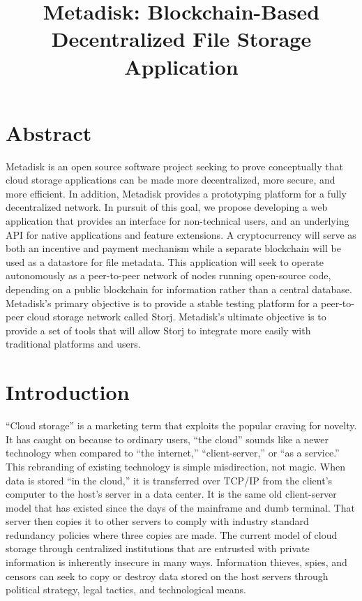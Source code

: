 \documentclass[a4paper,12pt]{article}
\begin{document}
\title{\large \bf Metadisk:  Blockchain-Based Decentralized File Storage Application}
\maketitle

\section*{Abstract}
Metadisk is an open source software project seeking to prove conceptually that cloud storage applications can be made more decentralized, more secure, and more efficient. In addition, Metadisk provides a prototyping platform for a fully decentralized network. In pursuit of this goal, we propose developing a web application that provides an interface for non-technical users, and an underlying API for native applications and feature extensions. A cryptocurrency will serve as both an incentive and payment mechanism while a separate blockchain will be used as a datastore for file metadata. This application will seek to operate autonomously as a peer-to-peer network of nodes running open-source code, depending on a public blockchain for information rather than a central database. Metadisk’s primary objective is to provide a stable testing platform for a peer-to-peer cloud storage network called Storj. Metadisk’s ultimate objective is to provide a set of tools that will allow Storj to integrate more easily with traditional platforms and users. 

\section*{Introduction}
“Cloud storage” is a marketing term that exploits the popular craving for novelty. It has caught on because to ordinary users, “the cloud” sounds like a newer technology when compared to “the internet,” “client-server,” or “as a service.” This rebranding of existing technology is simple misdirection, not magic.  When data is stored “in the cloud,” it is transferred over TCP/IP from the client’s computer to the host’s server in a data center.  It is the same old client-server model that has existed since the days of the mainframe and dumb terminal. That server then copies it to other servers to comply with industry standard redundancy policies where three copies are made. The current model of cloud storage through centralized institutions that are entrusted with private information is inherently insecure in many ways.  Information thieves, spies, and censors can seek to copy or destroy data stored on the host servers through political strategy, legal tactics, and technological means.  
\end{document}
